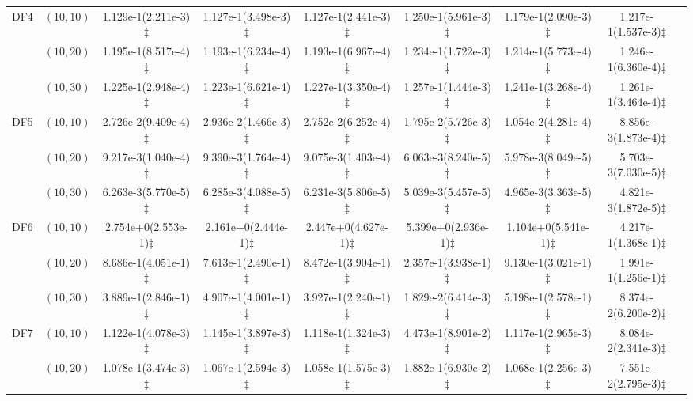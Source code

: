 \documentclass[review]{elsarticle}
\begin{document}
\begin{table*}[!tbh]
{{\begin{tabular} {ccccccccc}
\hline  \multirow{3}{*}{DF4}
&$(10,10)$ &1.129e-1(2.211e-3)$\ddagger$ &1.127e-1(3.498e-3)$\ddagger$ &1.127e-1(2.441e-3)$\ddagger$ &1.250e-1(5.961e-3)$\ddagger$ &1.179e-1(2.090e-3)$\ddagger$ &1.217e-1(1.537e-3)$\ddagger$ \\
&$(10,20)$ &1.195e-1(8.517e-4)$\ddagger$ &1.193e-1(6.234e-4)$\ddagger$ &1.193e-1(6.967e-4)$\ddagger$ &1.234e-1(1.722e-3)$\ddagger$ &1.214e-1(5.773e-4)$\ddagger$ &1.246e-1(6.360e-4)$\ddagger$ \\
&$(10,30)$ &1.225e-1(2.948e-4)$\ddagger$ &1.223e-1(6.621e-4)$\ddagger$ &1.227e-1(3.350e-4)$\ddagger$ &1.257e-1(1.444e-3)$\ddagger$ &1.241e-1(3.268e-4)$\ddagger$ &1.261e-1(3.464e-4)$\ddagger$ \\
\hline  \multirow{3}{*}{DF5}
&$(10,10)$ &2.726e-2(9.409e-4)$\ddagger$ &2.936e-2(1.466e-3)$\ddagger$ &2.752e-2(6.252e-4)$\ddagger$ &1.795e-2(5.726e-3)$\ddagger$ &1.054e-2(4.281e-4)$\ddagger$ &8.856e-3(1.873e-4)$\ddagger$ \\
&$(10,20)$ &9.217e-3(1.040e-4)$\ddagger$ &9.390e-3(1.764e-4)$\ddagger$ &9.075e-3(1.403e-4)$\ddagger$ &6.063e-3(8.240e-5)$\ddagger$ &5.978e-3(8.049e-5)$\ddagger$ &5.703e-3(7.030e-5)$\ddagger$ \\
&$(10,30)$ &6.263e-3(5.770e-5)$\ddagger$ &6.285e-3(4.088e-5)$\ddagger$ &6.231e-3(5.806e-5)$\ddagger$ &5.039e-3(5.457e-5)$\ddagger$ &4.965e-3(3.363e-5)$\ddagger$ &4.821e-3(1.872e-5)$\ddagger$ \\
\hline  \multirow{3}{*}{DF6}
&$(10,10)$ &2.754e+0(2.553e-1)$\ddagger$ &2.161e+0(2.444e-1)$\ddagger$ &2.447e+0(4.627e-1)$\ddagger$ &5.399e+0(2.936e-1)$\ddagger$ &1.104e+0(5.541e-1)$\ddagger$ &4.217e-1(1.368e-1)$\ddagger$ \\
&$(10,20)$ &8.686e-1(4.051e-1)$\ddagger$ &7.613e-1(2.490e-1)$\ddagger$ &8.472e-1(3.904e-1)$\ddagger$ &2.357e-1(3.938e-1)$\ddagger$ &9.130e-1(3.021e-1)$\ddagger$ &1.991e-1(1.256e-1)$\ddagger$ \\
&$(10,30)$ &3.889e-1(2.846e-1)$\ddagger$ &4.907e-1(4.001e-1)$\ddagger$ &3.927e-1(2.240e-1)$\ddagger$ &1.829e-2(6.414e-3)$\ddagger$ &5.198e-1(2.578e-1)$\ddagger$ &8.374e-2(6.200e-2)$\ddagger$ \\
\hline  \multirow{3}{*}{DF7}
&$(10,10)$ &1.122e-1(4.078e-3)$\ddagger$ &1.145e-1(3.897e-3)$\ddagger$ &1.118e-1(1.324e-3)$\ddagger$ &4.473e-1(8.901e-2)$\ddagger$ &1.117e-1(2.965e-3)$\ddagger$ &8.084e-2(2.341e-3)$\ddagger$ \\
&$(10,20)$ &1.078e-1(3.474e-3)$\ddagger$ &1.067e-1(2.594e-3)$\ddagger$ &1.058e-1(1.575e-3)$\ddagger$ &1.882e-1(6.930e-2)$\ddagger$ &1.068e-1(2.256e-3)$\ddagger$ &7.551e-2(2.795e-3)$\ddagger$ \\

\end{tabular}}}
\end{table*}
\end{document}
